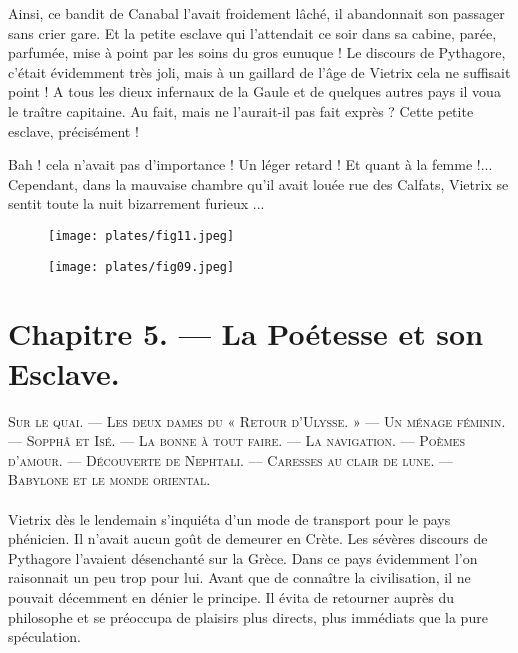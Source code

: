 \documentclass[a4paper, 11pt, oneside, polutonikogreek, french]{article}
\begin{document}
Ainsi, ce bandit de Canabal l'avait froidement lâché, il abandonnait son passager sans crier gare. Et la petite esclave qui l'attendait ce soir dans sa cabine, parée, parfumée, mise à point par les soins du gros eunuque ! Le discours de Pythagore, c'était évidemment très joli, mais à un gaillard de l'âge de Vietrix cela ne suffisait point ! A tous les dieux infernaux de la Gaule et de quelques autres pays il voua le traître capitaine. Au fait, mais ne l'aurait-il pas fait exprès ? Cette petite esclave, précisément !

Bah ! cela n'avait pas d'importance ! Un léger retard ! Et quant à la femme !... Cependant, dans la mauvaise chambre qu'il avait louée rue des Calfats, Vietrix se sentit toute la nuit bizarrement furieux ...

\begin{figure}[H]
\centering
\texttt{[image: plates/fig11.jpeg]}
\end{figure}
\clearpage
\begin{figure}[H]
\centering
\texttt{[image: plates/fig09.jpeg]}
\end{figure}
\section{Chapitre 5. --- La Poétesse et son Esclave.}
\begin{center}
\scshape
\small
Sur le quai. --- Les deux dames du « Retour d'Ulysse. » --- Un ménage féminin. --- Sopphâ et Isé. --- La bonne à tout faire. --- La navigation. --- Poèmes d'amour. --- Découverte de Nephtali. --- Caresses au clair de lune. --- Babylone et le monde oriental.
\end{center}
\paragraph{}
Vietrix dès le lendemain s'inquiéta d'un mode de transport pour le pays phénicien. Il n'avait aucun goût de demeurer en Crète. Les sévères discours de Pythagore l'avaient désenchanté sur la Grèce. Dans ce pays évidemment l'on raisonnait un peu trop pour lui. Avant que de connaître la civilisation, il ne pouvait décemment en dénier le principe. Il évita de retourner auprès du philosophe et se préoccupa de plaisirs plus directs, plus immédiats que la pure spéculation.

\bigskip
\centerline{\EightStarTaper}
\centerline{\EightStarTaper\EightStarTaper}
\bigskip
\end{document}
